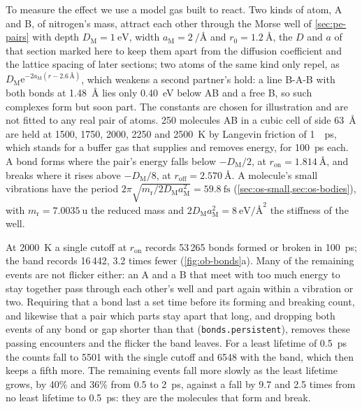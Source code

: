 To measure the effect we use a model gas built to react. Two kinds of
atom, A and B, of nitrogen's mass, attract each other through the Morse
well of \cref{sec:pe-pairs} with depth $D_{\mathrm M} = \SI{1}{\electronvolt}$,
width $a_{\mathrm M} = \SI{2}{\per\angstrom}$ and $r_0 = \SI{1.2}{\angstrom}$, the $D$
and $a$ of that section marked here to keep them apart from the
diffusion coefficient and the lattice spacing of later sections; two atoms of
the same kind only repel, as $D_{\mathrm M}\mathrm{e}^{-2a_{\mathrm M}(r - 2.6\,\text{\AA})}$, which
weakens a second partner's hold: a line B-A-B with both bonds at
\SI{1.48}{\angstrom} lies only \SI{0.40}{\electronvolt} below AB and a free
B, so such complexes form but soon part. The constants are chosen for
illustration and are not fitted to any real pair of atoms. 250 molecules
AB in a cubic cell of side \SI{63}{\angstrom} are held at 1500, 1750,
2000, 2250 and \SI{2500}{\kelvin} by Langevin friction of \SI{1}{\per\pico\second}, which
stands for a buffer gas that supplies and removes energy, for
\SI{100}{\pico\second} each. A bond forms where the pair's energy falls
below $-D_{\mathrm M}/2$, at $r_{\mathrm{on}} = \SI{1.814}{\angstrom}$, and breaks
where it rises above $-D_{\mathrm M}/8$, at $r_{\mathrm{off}} = \SI{2.570}{\angstrom}$.
A molecule's small vibrations have the period $2\pi\sqrt{m_{\mathrm r}/2D_{\mathrm M}a_{\mathrm M}^2}
= \SI{59.8}{\femto\second}$ (\cref{sec:os-small,sec:os-bodies}), with
$m_{\mathrm r} = \SI{7.0035}{\amu}$ the reduced mass and $2D_{\mathrm M}a_{\mathrm M}^2 =
\SI{8}{\electronvolt\per\angstrom\squared}$ the stiffness of the well.

At \SI{2000}{\kelvin} a single cutoff at $r_{\mathrm{on}}$ records 53\,265
bonds formed or broken in \SI{100}{\pico\second}; the band records 16\,442,
3.2 times fewer (\cref{fig:ob-bonds}a). Many of the remaining events are
not flicker either: an A and a B that meet with too much energy to stay
together pass through each other's well and part again within a
vibration or two. Requiring that a bond last a set time before its
forming and breaking count, and likewise that a pair which parts stay
apart that long, and dropping both events of any bond or gap shorter than
that (\texttt{bonds.persistent}), removes these passing encounters and the
flicker the band leaves. For a least lifetime of \SI{0.5}{\pico\second}
the counts fall to \num{5501} with the single cutoff and \num{6548} with
the band, which then keeps a fifth more. The remaining events fall
more slowly as the least lifetime grows, by 40\% and 36\% from 0.5 to
\SI{2}{\pico\second}, against a fall by 9.7 and 2.5 times from no least
lifetime to \SI{0.5}{\pico\second}: they are the molecules that form and
break.

